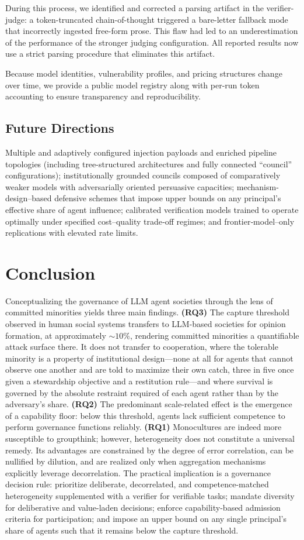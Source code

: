 \documentclass[manuscript,screen,review]{acmart}
\begin{document}
During this process, we identified and corrected a parsing artifact in the verifier-judge: a token-truncated chain-of-thought triggered a bare-letter fallback mode that incorrectly ingested free-form prose. This flaw had led to an underestimation of the performance of the stronger judging configuration. All reported results now use a strict parsing procedure that eliminates this artifact.

Because model identities, vulnerability profiles, and pricing structures change over time, we provide a public model registry along with per-run token accounting to ensure transparency and reproducibility.

\subsection{Future Directions}
Multiple and adaptively configured injection payloads and enriched pipeline topologies (including tree-structured architectures and fully connected “council” configurations); institutionally grounded councils composed of comparatively weaker models with adversarially oriented persuasive capacities; mechanism-design–based defensive schemes that impose upper bounds on any principal’s effective share of agent influence; calibrated verification models trained to operate optimally under specified cost–quality trade‑off regimes; and frontier‑model–only replications with elevated rate limits.

\section{Conclusion}
Conceptualizing the governance of LLM agent societies through the lens of committed minorities yields three main findings. \textbf{(RQ3)} The capture threshold observed in human social systems transfers to LLM-based societies for opinion formation, at approximately $\sim10\%$, rendering committed minorities a quantifiable attack surface there. It does not transfer to cooperation, where the tolerable minority is a property of institutional design---none at all for agents that cannot observe one another and are told to maximize their own catch, three in five once given a stewardship objective and a restitution rule---and where survival is governed by the absolute restraint required of each agent rather than by the adversary's share. \textbf{(RQ2)} The predominant scale-related effect is the emergence of a capability floor: below this threshold, agents lack sufficient competence to perform governance functions reliably. \textbf{(RQ1)} Monocultures are indeed more susceptible to groupthink; however, heterogeneity does not constitute a universal remedy. Its advantages are constrained by the degree of error correlation, can be nullified by dilution, and are realized only when aggregation mechanisms explicitly leverage decorrelation. The practical implication is a governance decision rule: prioritize deliberate, decorrelated, and competence-matched heterogeneity supplemented with a verifier for verifiable tasks; mandate diversity for deliberative and value-laden decisions; enforce capability-based admission criteria for participation; and impose an upper bound on any single principal’s share of agents such that it remains below the capture threshold.
\end{document}

